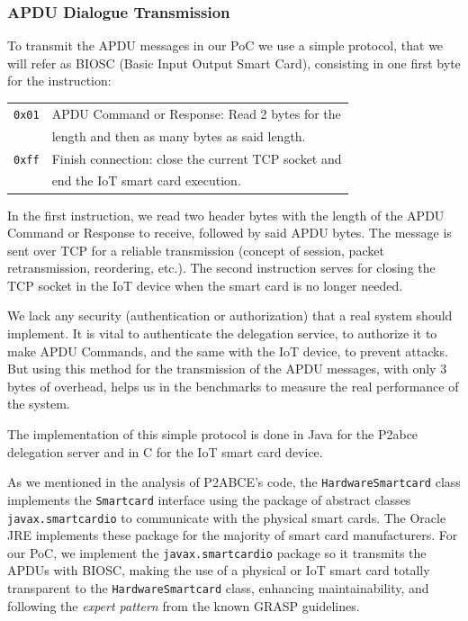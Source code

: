 \subsubsection{APDU Dialogue Transmission}


To transmit the APDU messages in our PoC we use a simple protocol, that we will refer as BIOSC (Basic Input Output Smart Card), consisting in one first byte for the instruction: 

\hfil

\begin{tabular}{|c|l|}
	\hline
	\texttt{0x01} & APDU Command or Response: Read 2 bytes for the\\& length and then as many bytes as said length. \\
	\hline
	\texttt{0xff} & Finish connection: close the current TCP socket and\\& end the IoT smart card execution. \\
	\hline
\end{tabular}

\hfil

In the first instruction, we read two header bytes with the length of the APDU Command or Response to receive, followed by said APDU bytes. The message is sent over TCP for a reliable transmission (concept of session, packet retransmission, reordering, etc.). The second instruction serves for closing the TCP socket in the IoT device when the smart card is no longer needed.

We lack any security (authentication or authorization) that a real system should implement. It is vital to authenticate the delegation service, to authorize it to make APDU Commands, and the same with the IoT device, to prevent attacks. But using this method for the transmission of the APDU messages, with only 3 bytes of overhead, helps us in the  benchmarks to measure the real performance of the system.


\hfil


The implementation of this simple protocol is done in Java for the P2abce delegation server and in C for the IoT smart card device.



\hfil

As we mentioned in the analysis of P2ABCE's code, the \texttt{HardwareSmartcard} class implements the \texttt{Smartcard} interface using the package of abstract classes \texttt{javax.smartcardio} to communicate with the physical smart cards. The Oracle JRE implements these package for the majority of smart card manufacturers. For our PoC, we implement the \texttt{javax.smartcardio} package so it transmits the APDUs with BIOSC, making the use of a physical or IoT smart card totally transparent to the \texttt{HardwareSmartcard} class, enhancing maintainability, and following the \textit{expert pattern} from the known GRASP guidelines.

